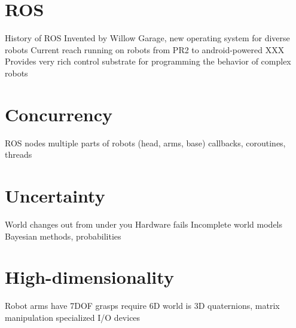 \documentclass{article}
\begin{document}
\section{ROS}

History of ROS
Invented by Willow Garage, new operating system for diverse robots
Current reach
running on robots from PR2 to android-powered XXX
Provides very rich control substrate for programming the behavior of complex robots

\section{Concurrency}

ROS nodes
multiple parts of robots (head, arms, base)
callbacks, coroutines, threads

\section{Uncertainty}

World changes out from under you
Hardware fails
Incomplete world models
Bayesian methods, probabilities

\section{High-dimensionality}

Robot arms have 7DOF
grasps require 6D
world is 3D
quaternions, matrix manipulation
specialized I/O devices



\end{document}
